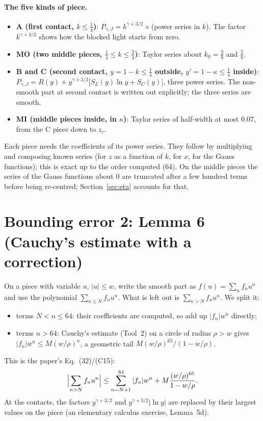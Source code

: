 \documentclass[11pt,a4paper]{article}
\theoremstyle{remark}
\begin{document}
\paragraph{The five kinds of piece.}
\begin{itemize}
  \item \textbf{A (first contact, $k\le\tfrac14$)}: $P_{\gamma,J}=k^{\gamma+3/2}\times$(power series
        in $k$). The factor $k^{\gamma+3/2}$ shows how the blocked light starts from zero.
  \item \textbf{MO (two middle pieces, $\tfrac14\le k\le\tfrac34$)}: Taylor series about $k_0=\tfrac38$
        and $\tfrac58$.
  \item \textbf{B and C (second contact, $y=1-k\le\tfrac14$ outside, $y'=1-\kappa\le\tfrac14$ inside)}:
        $P_{\gamma,J}=R(y)+y^{\gamma+3/2}\bigl[S_L(y)\ln y+S_C(y)\bigr]$, three power series. The
        non-smooth part at second contact is written out explicitly; the three series are smooth.
  \item \textbf{MI (middle pieces inside, in $\kappa$)}: Taylor series of half-width at most $0.07$,
        from the C piece down to $z_c$.
\end{itemize}
Each piece needs the coefficients of its power series. They follow by multiplying and composing
known series (for $z$ as a function of $k$, for $x$, for the Gauss functions); this is exact up to
the order computed (64). On the middle pieces the series of the Gauss functions about $0$ are
truncated after a few hundred terms before being re-centred; Section~\ref{sec:eta} accounts for
that.

\section{Bounding error 2: Lemma 6 (Cauchy's estimate with a correction)}

On a piece with variable $u$, $|u|\le w$, write the smooth part as $f(u)=\sum_nf_nu^n$ and use the
polynomial $\sum_{n\le N}f_nu^n$. What is left out is $\sum_{n>N}f_nu^n$. We split it:
\begin{itemize}
  \item terms $N<n\le64$: their coefficients are computed, so add up $|f_n|w^n$ directly;
  \item terms $n>64$: Cauchy's estimate (Tool~2) on a circle of radius $\rho>w$ gives
        $|f_n|w^n\le M(w/\rho)^n$, a geometric tail $M(w/\rho)^{65}/(1-w/\rho)$.
\end{itemize}
This is the paper's Eq.~(32)/(C15):
\[
  \Bigl|\sum_{n>N}f_nu^n\Bigr|\le\sum_{n=N+1}^{64}|f_n|w^n+M\frac{(w/\rho)^{65}}{1-w/\rho}.
\]
At the contacts, the factors $y^{\gamma+3/2}$ and $y^{\gamma+3/2}|\ln y|$ are replaced by their
largest values on the piece (an elementary calculus exercise, Lemma~5d).
\end{document}
